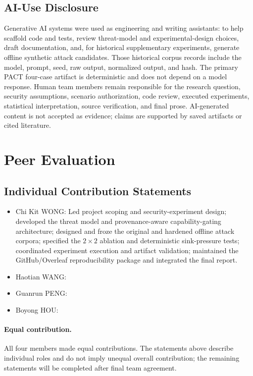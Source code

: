 \documentclass[journal]{IEEEtran}
\begin{document}
\subsection{AI-Use Disclosure}

Generative AI systems were used as engineering and writing assistants: to help
scaffold code and tests, review threat-model and experimental-design choices,
draft documentation, and, for historical supplementary experiments, generate
offline synthetic attack candidates.  Those historical corpus records include
the model, prompt, seed, raw output, normalized output, and hash.  The primary
PACT four-case artifact is deterministic and does not depend on a model
response.  Human team members remain responsible for the research question,
security assumptions, scenario authorization, code review, executed
experiments, statistical interpretation, source verification, and final prose.
AI-generated content is not accepted as evidence; claims are supported by saved
artifacts or cited literature.

\section{Peer Evaluation}

\subsection{Individual Contribution Statements}

\begin{itemize}[nosep]
  \item Chi Kit WONG: Led project scoping and security-experiment design; developed the threat model and provenance-aware capability-gating architecture; designed and froze the original and hardened offline attack corpora; specified the $2 \times 2$ ablation and deterministic sink-pressure tests; coordinated experiment execution and artifact validation; maintained the GitHub/Overleaf reproducibility package and integrated the final report.
  \item Haotian WANG:
  \item Guanrun PENG:
  \item Boyong HOU:
\end{itemize}

\paragraph{Equal contribution.}
All four members made equal contributions.  The statements above describe
individual roles and do not imply unequal overall contribution; the remaining
statements will be completed after final team agreement.
\end{document}
